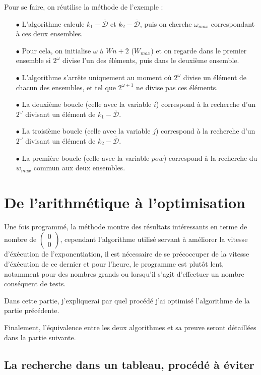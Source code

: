 \documentclass[12pt, a4paper]{memoir}
\newcommand{\doublezero}{\begin{pmatrix} 0 \\ 0 \end{pmatrix}}
\newcommand{\dbarre}{\overline{\mathcal{D}}}
\begin{document}
Pour se faire, on réutilise la méthode de l'exemple : \\
\begin{itemize}
 \item [$\bullet$] L'algorithme calcule $k_1 - \dbarre$ et $k_2 - \dbarre$, puis on cherche $\omega_{max}$ correspondant à ces deux ensembles.
 \item [$\bullet$] Pour cela, on initialise $\omega$ à $Wn+2$ ($W_{max}$) et on regarde dans le premier ensemble si $2^\omega$ divise l'un des éléments,
 puis dans le deuxième ensemble.
 \item [$\bullet$] L'algorithme s'arrête uniquement au moment où $2^\omega$ divise un élément de chacun des ensembles, et tel que $2^{\omega + 1}$
 ne divise pas ces éléments.
 \item [$\bullet$] La deuxième boucle (celle avec la variable $i$) correspond à la recherche d'un $2^\omega$ divisant un élément de $k_1 - \dbarre$.
 \item [$\bullet$] La troisième boucle (celle avec la variable $j$) correspond à la recherche d'un $2^\omega$ divisant un élément de $k_2 - \dbarre$.
 \item [$\bullet$] La première boucle (celle avec la variable $pow$) correspond à la recherche du $w_{max}$ commun aux deux ensembles.
 \end{itemize}

 \section{De l'arithmétique à l'optimisation}
   
Une fois programmé, la méthode montre des résultats intéressants en terme de nombre de $\doublezero$, cependant 
l'algorithme utilisé servant à améliorer la vitesse d'éxécution de l'exponentiation, il est nécessaire de se précoccuper
de la vitesse d'éxécution de ce dernier et pour l'heure, le programme est plutôt lent, notamment pour des nombres grands
ou lorsqu'il s'agit d'effectuer un nombre conséquent de tests.

Dans cette partie, j'expliquerai par quel procédé j'ai optimisé l'algorithme de la partie précédente.

Finalement, l'équivalence entre les deux algorithmes et sa preuve seront détaillées dans la partie suivante.

    \subsection{La recherche dans un tableau, procédé à éviter}
    
\end{document}
